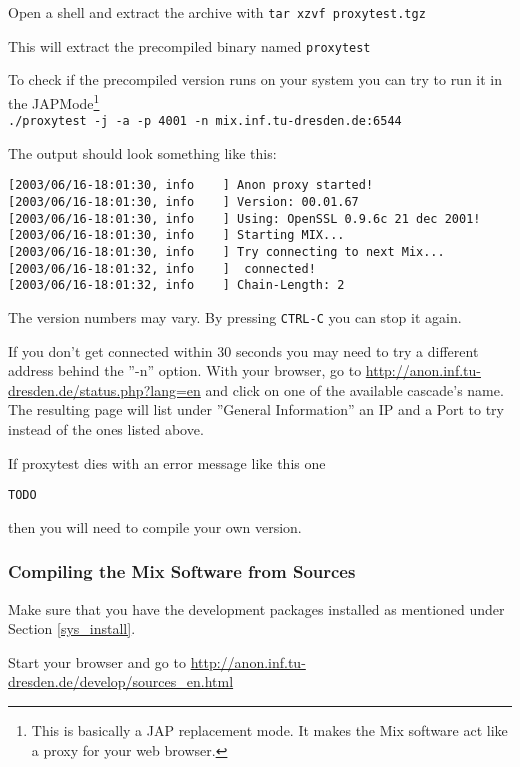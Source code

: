 \documentclass{article}
\begin{document}
Open a shell and extract the archive with \verb|tar xzvf proxytest.tgz|

This will extract the precompiled binary named \verb|proxytest|

To check if the precompiled version runs on your system you can try to run
it in the JAP\-Mode\footnote{This is basically a JAP replacement mode. It
makes the Mix software act like a proxy for your web browser.}\\

\verb|./proxytest -j -a -p 4001 -n mix.inf.tu-dresden.de:6544|

The output should look something like this:
\begin{verbatim}
[2003/06/16-18:01:30, info    ] Anon proxy started!
[2003/06/16-18:01:30, info    ] Version: 00.01.67
[2003/06/16-18:01:30, info    ] Using: OpenSSL 0.9.6c 21 dec 2001!
[2003/06/16-18:01:30, info    ] Starting MIX...
[2003/06/16-18:01:30, info    ] Try connecting to next Mix...
[2003/06/16-18:01:32, info    ]  connected!
[2003/06/16-18:01:32, info    ] Chain-Length: 2
\end{verbatim}

The version numbers may vary. By pressing \verb|CTRL-C| you can stop it again.

If you don't get connected within 30 seconds you may need to try a different
address behind the ''-n'' option. With your browser, go to
\url{http://anon.inf.tu-dresden.de/status.php?lang=en} and click on one of
the available cascade's name. The resulting page will list under ''General
Information'' an IP and a Port to try instead of the ones listed above.

If proxytest dies with an error message like
this one

\verb|TODO|

then you will need to compile your own version.


\subsubsection{Compiling the Mix Software from Sources}
\label{compilemix}

Make sure that you have the development packages installed as mentioned
under Section \ref{sys_install}.

Start your browser and go to
\url{http://anon.inf.tu-dresden.de/develop/sources_en.html}
\end{document}
